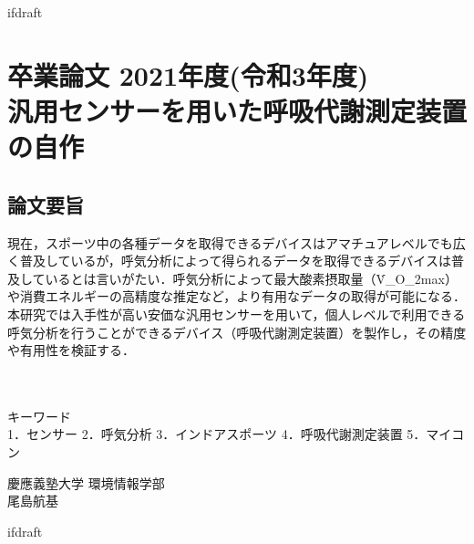 \expandafter\ifx\csname ifdraft\endcsname\relax
 
\fi

\section*{卒業論文 2021年度(令和3年度)\\汎用センサーを用いた呼吸代謝測定装置の自作}
\subsection*{論文要旨}
\noindent %

現在，スポーツ中の各種データを取得できるデバイスはアマチュアレベルでも広く普及しているが，呼気分析によって得られるデータを取得できるデバイスは普及しているとは言いがたい．呼気分析によって最大酸素摂取量（\.{V}_{O_2max}）や消費エネルギーの高精度な推定など，より有用なデータの取得が可能になる．本研究では入手性が高い安価な汎用センサーを用いて，個人レベルで利用できる呼気分析を行うことができるデバイス（呼吸代謝測定装置）を製作し，その精度や有用性を検証する．

\\
\\
キーワード\\
1．センサー 2．呼気分析 3．インドアスポーツ 4．呼吸代謝測定装置 5．マイコン\\
\begin{flushright} %
  慶應義塾大学 環境情報学部\\
  尾島航基
\end{flushright}

\expandafter\ifx\csname ifdraft\endcsname\relax
  
\fi
